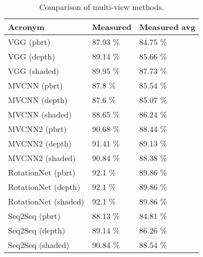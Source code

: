 \begin{table}[]
	\begin{tabular}{lll}
		\hline
		\textbf{Acronym}    & Measured & Measured avg \\ \hline
		VGG (pbrt)           & 87.93 \% & 84.75 \%     \\
		VGG (depth)          & 89.14 \% & 85.66 \%     \\
		VGG (shaded)         & 89.95 \% & 87.73 \%     \\
		MVCNN (pbrt)        & 87.8 \%  & 85.54 \%     \\
		MVCNN (depth)       & 87.6 \%  & 85.07 \%     \\
		MVCNN (shaded)      & 88.65 \% & 86.24 \%     \\
		MVCNN2 (pbrt)       & 90.68 \% & 88.44 \%     \\
		MVCNN2 (depth)      & 91.41 \% & 89.13 \%     \\
		MVCNN2 (shaded)     & 90.84 \% & 88.38 \%     \\
		RotationNet (pbrt)   & 92.1 \%  & 89.86 \%     \\
		RotationNet (depth)  & 92.1 \%  & 89.86 \%     \\
		RotationNet (shaded) & 92.1 \%  & 89.86 \%     \\
		Seq2Seq  (pbrt)     & 88.13 \% & 84.81 \%     \\
		Seq2Seq  (depth)    & 89.14 \% & 86.26 \%     \\
		Seq2Seq  (shaded)   & 90.84 \% & 88.54 \%
	\end{tabular}
\caption{Comparison of multi-view methods.}
\label{Table:mv}
\end{table}
